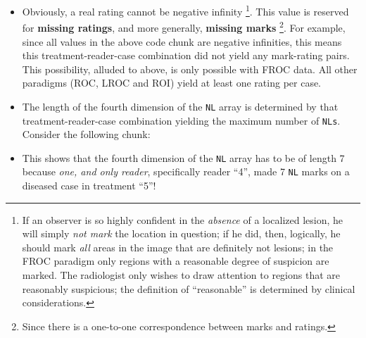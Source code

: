 \documentclass[]{book}
\newenvironment{Shaded}{\begin{snugshade}}{\end{snugshade}}
\newcommand{\CharTok}[1]{\textcolor[rgb]{0.31,0.60,0.02}{#1}}
\newcommand{\CommentTok}[1]{\textcolor[rgb]{0.56,0.35,0.01}{\textit{#1}}}
\newcommand{\ControlFlowTok}[1]{\textcolor[rgb]{0.13,0.29,0.53}{\textbf{#1}}}
\newcommand{\DecValTok}[1]{\textcolor[rgb]{0.00,0.00,0.81}{#1}}
\newcommand{\KeywordTok}[1]{\textcolor[rgb]{0.13,0.29,0.53}{\textbf{#1}}}
\newcommand{\NormalTok}[1]{#1}
\newcommand{\OperatorTok}[1]{\textcolor[rgb]{0.81,0.36,0.00}{\textbf{#1}}}
\newcommand{\OtherTok}[1]{\textcolor[rgb]{0.56,0.35,0.01}{#1}}
\newcommand{\StringTok}[1]{\textcolor[rgb]{0.31,0.60,0.02}{#1}}
\providecommand{\tightlist}{%
  \setlength{\itemsep}{0pt}\setlength{\parskip}{0pt}}
\let\rmarkdownfootnote\footnote%
\def\footnote{\protect\rmarkdownfootnote}
\begin{document}
\begin{itemize}
\tightlist
\item
  Obviously, a real rating cannot be negative infinity \footnote{If an observer is so highly confident in the \emph{absence} of a localized lesion, he will simply \emph{not mark} the location in question; if he did, then, logically, he should mark \emph{all} areas in the image that are definitely not lesions; in the FROC paradigm only regions with a reasonable degree of suspicion are marked. The radiologist only wishes to draw attention to regions that are reasonably suspicious; the definition of ``reasonable'' is determined by clinical considerations.}. This value is reserved for \textbf{missing ratings}, and more generally, \textbf{missing marks} \footnote{Since there is a one-to-one correspondence between marks and ratings.}. For example, since all values in the above code chunk are negative infinities, this means this treatment-reader-case combination did not yield any mark-rating pairs. This possibility, alluded to above, is only possible with FROC data. All other paradigms (ROC, LROC and ROI) yield at least one rating per case.
\item
  The length of the fourth dimension of the \texttt{NL} array is determined by that treatment-reader-case combination yielding the maximum number of \texttt{NLs}. Consider the following chunk:
\end{itemize}

\begin{Shaded}
\end{Shaded}

\begin{itemize}
\tightlist
\item
  This shows that the fourth dimension of the \texttt{NL} array has to be of length 7 because \emph{one, and only reader}, specifically reader ``4'', made 7 \texttt{NL} marks on a diseased case in treatment ``5''!
\end{itemize}
\end{document}
